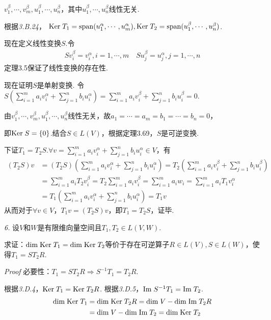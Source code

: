 \(v_1^\beta,\cdots,v_m^\beta,u_1^\beta,\cdots,u_n^\beta\)，其中\(u_1^\beta,\cdots,u_n^\beta\)线性无关.

根据\textit{3.B.24}，
\(\mathrm{Ker \;} T_1=\mathrm{span} (u_1^\alpha,\cdots,u_m^\alpha),\mathrm{Ker \;} T_2=\mathrm{span} (u_1^\beta,\cdots,u_n^\beta)\).

现在定义线性变换\(S\).令
    \begin{align*}
        Sv_i^\beta=v_i^\alpha,i=1,\cdots,m \quad
        Su_j^\beta=u_j^\alpha,j=1,\cdots,n
    \end{align*}
定理3.5保证了线性变换的存在性.

现在证明\(S\)是单射变换.
令\(S(\sum_{i=1}^m a_iv_i^\alpha+\sum_{j=1}^n b_iu_i^\alpha)=\sum_{i=1}^m a_iv_i^\beta+\sum_{j=1}^n b_iu_i^\beta=0\).

由\(v_1^\beta,\cdots,v_m^\beta,u_1^\beta,\cdots,u_n^\beta\)线性无关，故\(a_1=\cdots=a_m=b_1=\cdots=b_n=0\)，

即\(\mathrm{Ker \;} S=\{0\}\).结合\(S \in L(V)\)，根据定理3.69，\(S\)是可逆变换.

下证\(T_1=T_2S\).\(\forall v=\sum_{i=1}^m a_iv_i^\alpha+\sum_{j=1}^n b_iu_i^\alpha \in V\)，有
    \begin{align*}
        (T_2S)v&=(T_2S)(\sum_{i=1}^m a_iv_i^\alpha+\sum_{j=1}^n b_iu_i^\alpha )
                =T_2(\sum_{i=1}^m a_iv_i^\beta+\sum_{j=1}^n b_iu_i^\beta ) \\
               &=\sum_{i=1}^m a_iT_2v_i^\beta=T_2\sum_{i=1}^m a_iv_i^\beta
                =\sum_{i=1}^m a_iw_i=\sum_{i=1}^m a_iT_1v_i^\alpha \\
               &=T_1(\sum_{i=1}^m a_iv_i^\alpha+\sum_{j=1}^n b_iu_i^\alpha)=T_1v
    \end{align*}
从而对于\(\forall v \in V\)，\(T_1v=(T_2S)v\)，即\(T_1=T_2S\)，证毕.

\newpage

\textit{6.}
设\(V\)和\(W\)是有限维向量空间且\(T_1,T_2 \in L(V,W)\).

求证：\(\mathrm{dim \;} \mathrm{Ker \;} T_1=\mathrm{dim \;} \mathrm{Ker \;} T_2\)等价于存在可逆算子\(R \in L(V),S \in L(W)\)，使得\(T_1=ST_2R\).

\textit{Proof}
必要性：\(T_1=ST_2R \Rightarrow S^{-1}T_1=T_2R\).

根据\textit{3.D.4}，\(\mathrm{Ker \;} T_1=\mathrm{Ker \;} T_2R\).
根据\textit{3.D.5}，\(\mathrm{Im \;} S^{-1}T_1=\mathrm{Im \;} T_2\).
    \begin{align*}
        \mathrm{dim \;} \mathrm{Ker \;} T_1 &=\mathrm{dim \;} \mathrm{Ker \;} T_2R=\mathrm{dim \;} V-\mathrm{dim \;} \mathrm{Im \;} T_2R \\
        &=\mathrm{dim \;} V-\mathrm{dim \;} \mathrm{Im \;} T_2=\mathrm{dim \;} \mathrm{Ker \;} T_2
    \end{align*}


